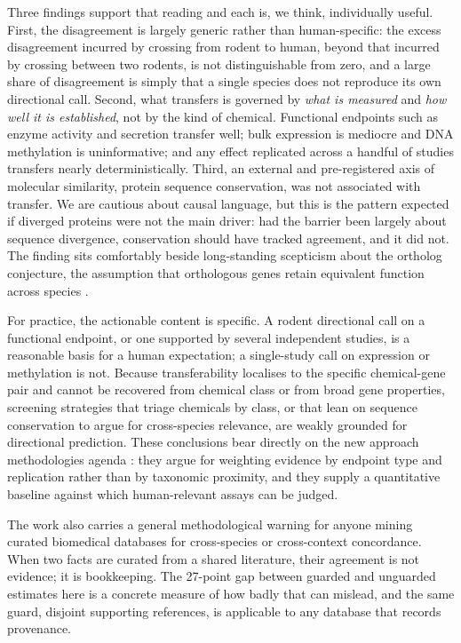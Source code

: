 \documentclass[review,12pt,authoryear]{elsarticle}
\begin{document}
Three findings support that reading and each is, we think, individually
useful. First, the disagreement is largely generic rather than human-specific:
the excess disagreement incurred by crossing from rodent to human, beyond that
incurred by crossing between two rodents, is not distinguishable from zero, and a
large share of disagreement is simply that a single species does not reproduce
its own directional call. Second, what transfers is governed by \emph{what is
measured} and \emph{how well it is established}, not by the kind of chemical.
Functional endpoints such as enzyme activity and secretion transfer well; bulk
expression is mediocre and DNA methylation is uninformative; and any effect
replicated across a handful of studies transfers nearly deterministically. Third,
an external and pre-registered axis of molecular similarity, protein sequence
conservation, was not associated with transfer. We are cautious about causal
language, but this is the pattern expected if diverged proteins were not the main
driver: had the barrier been largely about sequence divergence, conservation
should have tracked agreement, and it did not. The finding sits comfortably
beside long-standing scepticism about the ortholog conjecture, the assumption
that orthologous genes retain equivalent function across species
\citep{nehrt2011,chen2012ortholog}.

For practice, the actionable content is specific. A rodent directional call on a
functional endpoint, or one supported by several independent studies, is a
reasonable basis for a human expectation; a single-study call on expression or
methylation is not. Because transferability localises to the specific
chemical-gene pair and cannot be recovered from chemical class or from broad
gene properties, screening strategies that triage chemicals by class, or that
lean on sequence conservation to argue for cross-species relevance, are weakly
grounded for directional prediction. These conclusions bear directly on the new
approach methodologies agenda \citep{wu2026science,marshall2023}:
they argue for weighting evidence by endpoint type and replication rather than by
taxonomic proximity, and they supply a quantitative baseline against which
human-relevant assays can be judged.

The work also carries a general methodological warning for anyone mining curated
biomedical databases for cross-species or cross-context concordance. When two
facts are curated from a shared literature, their agreement is not evidence; it
is bookkeeping. The 27-point gap between guarded and unguarded estimates here is
a concrete measure of how badly that can mislead, and the same guard, disjoint
supporting references, is applicable to any database that records provenance.
\end{document}
